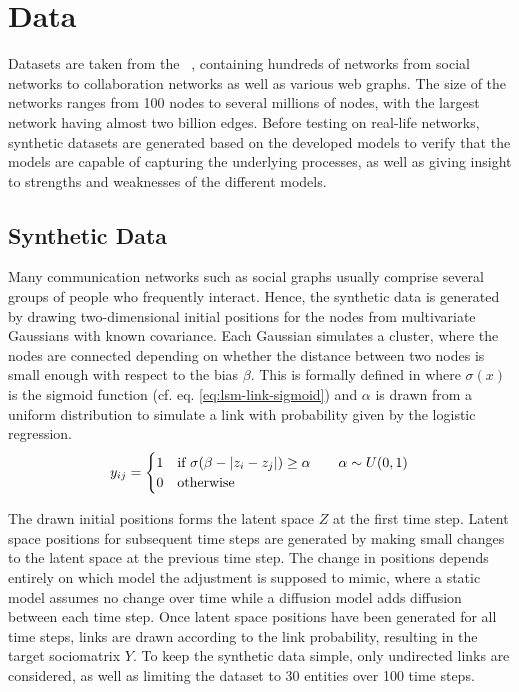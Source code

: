 \chapter{Data}\label{ch:Data}

Datasets are taken from the ~\cite{snapnets}, containing hundreds of networks from social networks to collaboration networks as well as various web graphs. The size of the networks ranges from 100 nodes to several millions of nodes, with the largest network having almost two billion edges.
Before testing on real-life networks, synthetic datasets are generated based on the developed models to verify that the models are capable of capturing the underlying processes, as well as giving insight to strengths and weaknesses of the different models. 

\section{Synthetic Data}

    Many communication networks such as social graphs usually comprise several groups of people who frequently interact. Hence, the synthetic data is generated by drawing two-dimensional initial positions for the nodes from multivariate Gaussians with known covariance. 
    Each Gaussian simulates a cluster, where the nodes are connected depending on whether the distance between two nodes is small enough with respect to the bias $\beta$. This is formally defined in  where $\sigma(x)$ is the sigmoid function (cf. eq. \ref{eq:lsm-link-sigmoid}) and $\alpha$ is drawn from a uniform distribution to simulate a link with probability given by the logistic regression.
    \begin{equation}\label{eq:synth-link}
        \sub(y) = 
        \begin{cases}
            1 & \text{if } \sigma(\beta - |z_i - z_j|) \geq \alpha \qquad \alpha\sim U(0,1) \\
            0 & \text{otherwise}
        \end{cases}
    \end{equation}
    
    The drawn initial positions forms the latent space $Z$ at the first time step. Latent space positions for subsequent time steps are generated by making small changes to the latent space at the previous time step. The change in positions depends entirely on which model the adjustment is supposed to mimic, where a static model assumes no change over time while a diffusion model adds diffusion between each time step. Once latent space positions have been generated for all time steps, links are drawn according to the link probability, resulting in the target sociomatrix $Y$. To keep the synthetic data simple, only undirected links are considered, as well as limiting the dataset to 30 entities over 100 time steps.
    
